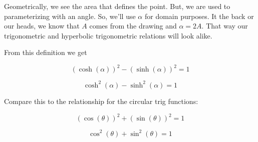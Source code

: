 \documentclass{ximera}
\begin{document}
Geometrically, we see the area that defines the point.  But, we are used to parameterizing with an angle.  So, we'll use $\alpha$ for domain purposes.  It the back or our heads, we know that $A$ comes from the drawing and $\alpha = 2 A$.  That way our trigonometric and hyperbolic trigonometric relations will look alike.



From this definition we get 

\[     (\cosh(\alpha))^2 - (\sinh(\alpha))^2 = 1       \]

\[     \cosh^2(\alpha) - \sinh^2(\alpha) = 1       \]

Compare this to the relationship for the circular trig functions:

\[     (\cos(\theta))^2 + (\sin(\theta))^2 = 1       \]

\[     \cos^2(\theta) + \sin^2(\theta) = 1       \]
\end{document}

